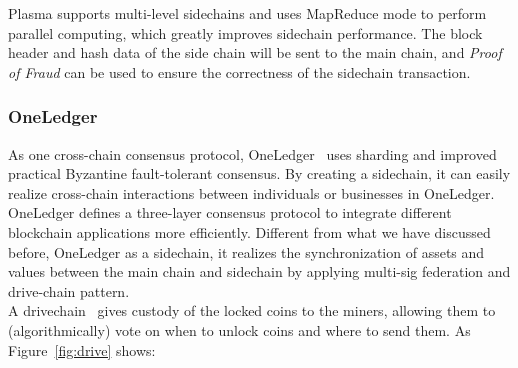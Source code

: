 \noindent Plasma supports multi-level sidechains and uses MapReduce mode to perform parallel computing, which greatly improves sidechain performance. The block header and hash data of the side chain will be sent to the main chain, and \textit{Proof of Fraud} can be used to ensure the correctness of the sidechain transaction.


\subsubsection{OneLedger}
\noindent As one cross-chain consensus protocol, OneLedger~\cite{Oneledger} uses sharding and improved practical Byzantine fault-tolerant consensus. By creating a sidechain, it can easily realize cross-chain interactions between individuals or businesses in OneLedger. OneLedger defines a three-layer consensus protocol to integrate different blockchain applications more efficiently. Different from what we have discussed before, OneLedger as a sidechain, it realizes the synchronization of assets and values between the main chain and sidechain by applying multi-sig federation and drive-chain pattern.\\

\noindent A drivechain~\cite{lerner2016drivechains} gives custody of the locked coins to the miners, allowing them to (algorithmically) vote on when to unlock coins and where to send them. As Figure~\ref{fig:drive} shows:

